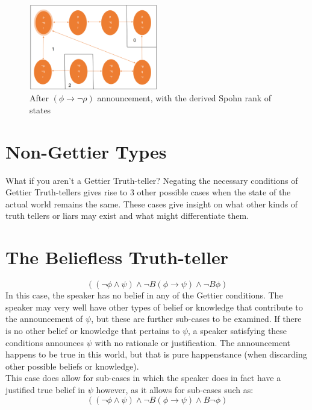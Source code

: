 \documentclass[12pt, titlepage, twoside, a4paper]{report}
\begin{document}
\begin{figure}[h]
  \centering
  \includegraphics[width=0.5\textwidth]{slide21.eps}
  \caption{After $(\phi \to \neg \rho)$ announcement, with the derived Spohn rank of states}
\end{figure}

\section{Non-Gettier Types}
What if you aren't a Gettier Truth-teller? Negating the necessary conditions of Gettier Truth-tellers gives rise to 3 other possible cases when the state of the actual world remains the same. These cases give insight on what other kinds of truth tellers or liars may exist and what might differentiate them.
\newpage
\section{The Beliefless Truth-teller}
$$((\neg \phi \wedge \psi) \wedge \neg B(\phi \to \psi) \wedge \neg B \phi)$$
In this case, the speaker has no belief in any of the Gettier conditions. The speaker may very well have other types of belief or knowledge that contribute to the announcement of $\psi$, but these are further sub-cases to be examined. If there is no other belief or knowledge that pertains to $\psi$, a speaker satisfying these conditions announces $\psi$ with no rationale or justification. The announcement happens to be true in this world, but that is pure happenstance (when discarding other possible beliefs or knowledge).\\
This case does allow for sub-cases in which the speaker does in fact have a justified true belief in $\psi$ however, as it allows for sub-cases such as:
$$((\neg \phi \wedge \psi) \wedge \neg B(\phi \to \psi) \wedge B \neg \phi)$$
\end{document}
